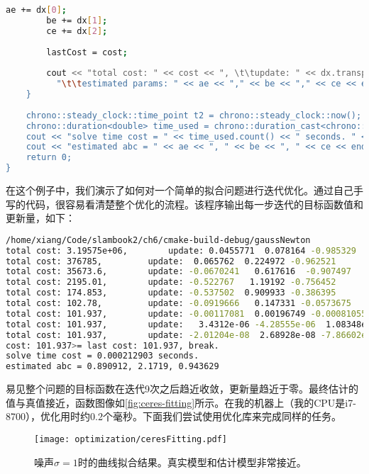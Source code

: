 \begin{lstlisting}[language=sh,caption=slambook2/ch6/gaussNewton.cpp]
        ae += dx[0];
        be += dx[1];
        ce += dx[2];
        
        lastCost = cost;
        
        cout << "total cost: " << cost << ", \t\tupdate: " << dx.transpose() <<
          "\t\testimated params: " << ae << "," << be << "," << ce << endl;
    }
    
    chrono::steady_clock::time_point t2 = chrono::steady_clock::now();
    chrono::duration<double> time_used = chrono::duration_cast<chrono::duration<double>>(t2 - t1);
    cout << "solve time cost = " << time_used.count() << " seconds. " << endl;
    cout << "estimated abc = " << ae << ", " << be << ", " << ce << endl;
    return 0;
}
\end{lstlisting}

在这个例子中，我们演示了如何对一个简单的拟合问题进行迭代优化。通过自己手写的代码，很容易看清楚整个优化的流程。该程序输出每一步迭代的目标函数值和更新量，如下：
\begin{lstlisting}[language=sh,caption=终端输出：]
/home/xiang/Code/slambook2/ch6/cmake-build-debug/gaussNewton
total cost: 3.19575e+06, 		update: 0.0455771  0.078164 -0.985329		estimated params: 2.04558,-0.921836,4.01467
total cost: 376785, 		update:  0.065762  0.224972 -0.962521		estimated params: 2.11134,-0.696864,3.05215
total cost: 35673.6, 		update: -0.0670241   0.617616  -0.907497		estimated params: 2.04432,-0.0792484,2.14465
total cost: 2195.01, 		update: -0.522767   1.19192 -0.756452		estimated params: 1.52155,1.11267,1.3882
total cost: 174.853, 		update: -0.537502  0.909933 -0.386395		estimated params: 0.984045,2.0226,1.00181
total cost: 102.78, 		update: -0.0919666   0.147331 -0.0573675		estimated params: 0.892079,2.16994,0.944438
total cost: 101.937, 		update: -0.00117081  0.00196749 -0.00081055		estimated params: 0.890908,2.1719,0.943628
total cost: 101.937, 		update:   3.4312e-06 -4.28555e-06  1.08348e-06		estimated params: 0.890912,2.1719,0.943629
total cost: 101.937, 		update: -2.01204e-08  2.68928e-08 -7.86602e-09		estimated params: 0.890912,2.1719,0.943629
cost: 101.937>= last cost: 101.937, break.
solve time cost = 0.000212903 seconds.
estimated abc = 0.890912, 2.1719, 0.943629
\end{lstlisting}
易见整个问题的目标函数在迭代9次之后趋近收敛，更新量趋近于零。最终估计的值与真值接近，函数图像如\autoref{fig:ceres-fitting}所示。在我的机器上（我的CPU是i7-8700），优化用时约0.2个毫秒。下面我们尝试使用优化库来完成同样的任务。

\begin{figure}[!ht]
    \centering
    \texttt{[image: optimization/ceresFitting.pdf]}
    \caption{噪声$\sigma=1$时的曲线拟合结果。真实模型和估计模型非常接近。}
    \label{fig:ceres-fitting}
\end{figure}

